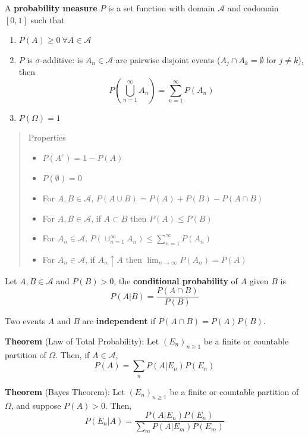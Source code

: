 \documentclass[12pt,]{book}
\providecommand{\tightlist}{%
  \setlength{\itemsep}{0pt}\setlength{\parskip}{0pt}}
\begin{document}
A \textbf{probability measure} \(P\) is a set function with domain \(\mathcal A\) and codomain \([0,1]\) such that

\begin{enumerate}
\def\labelenumi{\arabic{enumi}.}
\tightlist
\item
  \(P(A) \geq 0 \ \forall A \in \mathcal A\)
\item
  \(P\) is \(\sigma\)-additive: is \(A_n \in \mathcal A\) are pairwise disjoint events (\(A_j \cap A_k = \emptyset\) for \(j \neq k\)), then
  \[
    P\left(\bigcup _ {n=1}^{\infty} A_{n} \right)=\sum _ {n=1}^{\infty} P\left(A_{n}\right)
  \]
\item
  \(P(\Omega) = 1\)
\end{enumerate}

\begin{quote}
Properties

\begin{itemize}
\tightlist
\item
  \(P\left(A^{c}\right)=1-P(A)\)
\item
  \(P(\emptyset)=0\)
\item
  For \(A, B \in \mathcal{A}\), \(P(A \cup B)=P(A)+P(B)-P(A \cap B)\)
\item
  For \(A, B \in \mathcal{A}\), if \(A \subset B\) then \(P(A) \leq P(B)\)
\item
  For \(A_n \in \mathcal{A}\), \(P \left(\cup _ {n=1}^\infty A_{n} \right) \leq \sum _ {n=1}^\infty P(A_n)\)
\item
  For \(A_n \in \mathcal{A}\), if \(A_n \uparrow A\) then \(\lim _ {n \to \infty} P(A_n) = P(A)\)
\end{itemize}
\end{quote}

Let \(A, B \in \mathcal A\) and \(P(B) > 0\), the \textbf{conditional probability} of \(A\) given \(B\) is
\[
  P(A | B)=\frac{P(A \cap B)}{P(B)}
\]

Two events \(A\) and \(B\) are \textbf{independent} if \(P(A \cap B)=P(A) P(B)\).

\textbf{Theorem} (Law of Total Probability):
Let \((E_n) _ {n \geq 1}\) be a finite or countable partition of \(\Omega\). Then, if \(A \in \mathcal A\),
\[
  P(A) = \sum_n P(A | E_n ) P(E_n)
\]

\textbf{Theorem} (Bayes Theorem):
Let \((E_n) _ {n \geq 1}\) be a finite or countable partition of \(\Omega\), and suppose \(P(A) > 0\). Then,
\[
  P(E_n | A) = \frac{P(A | E_n) P(E_n)}{\sum_m P(A | E_m) P(E_m)}
\]
\end{document}
